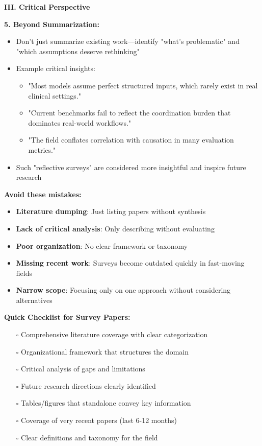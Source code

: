 \documentclass[11pt,a4paper]{article}
\begin{document}
\textbf{III. Critical Perspective}

\textbf{5. Beyond Summarization:}
\begin{itemize}
    \item Don't just summarize existing work—identify "what's problematic" and "which assumptions deserve rethinking"
    \item Example critical insights:
    \begin{itemize}
        \item "Most models assume perfect structured inputs, which rarely exist in real clinical settings."
        \item "Current benchmarks fail to reflect the coordination burden that dominates real-world workflows."
        \item "The field conflates correlation with causation in many evaluation metrics."
    \end{itemize}
    \item Such "reflective surveys" are considered more insightful and inspire future research
\end{itemize}

\begin{tcolorbox}[colback=yellow!10,colframe=red!50,title=Common Pitfalls in Survey Papers]
\textbf{Avoid these mistakes:}
\begin{itemize}
    \item \textbf{Literature dumping}: Just listing papers without synthesis
    \item \textbf{Lack of critical analysis}: Only describing without evaluating
    \item \textbf{Poor organization}: No clear framework or taxonomy
    \item \textbf{Missing recent work}: Surveys become outdated quickly in fast-moving fields
    \item \textbf{Narrow scope}: Focusing only on one approach without considering alternatives
\end{itemize}
\end{tcolorbox}

\textbf{Quick Checklist for Survey Papers:}
\begin{enumerate}
    \item[$\square$] Comprehensive literature coverage with clear categorization
    \item[$\square$] Organizational framework that structures the domain
    \item[$\square$] Critical analysis of gaps and limitations
    \item[$\square$] Future research directions clearly identified
    \item[$\square$] Tables/figures that standalone convey key information
    \item[$\square$] Coverage of very recent papers (last 6-12 months)
    \item[$\square$] Clear definitions and taxonomy for the field
\end{enumerate}
\end{document}
